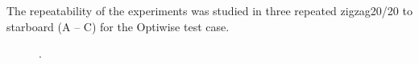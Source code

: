 The repeatability of the experiments was studied in three repeated zigzag20/20 to starboard (A -- C) for the Optiwise test case.  
\begin{figure}[h!]
    \centering   
    
    \caption{.}
    \label{fig:diff}
\end{figure}
%    
%
%    
